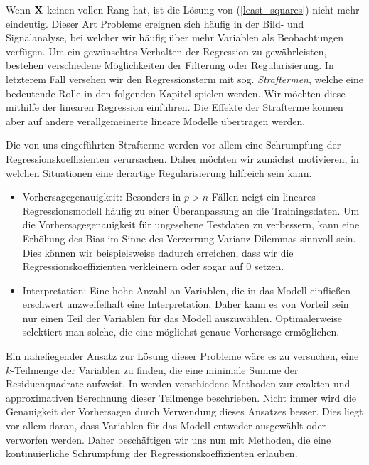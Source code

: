 Wenn $\mathbf{X}$ keinen vollen Rang hat, ist die Lösung von (\ref{least_squares}) nicht mehr eindeutig. Dieser Art Probleme ereignen sich häufig in der Bild- und Signalanalyse, bei welcher wir häufig über mehr Variablen als Beobachtungen verfügen. Um ein gewünschtes Verhalten der Regression zu gewährleisten, bestehen verschiedene Möglichkeiten der Filterung oder Regularisierung. In letzterem Fall versehen wir den Regressionsterm mit sog. \textit{Straftermen}, welche eine bedeutende Rolle in den folgenden Kapitel spielen werden. Wir möchten diese mithilfe der linearen Regression einführen. Die Effekte der Strafterme können aber auf andere verallgemeinerte lineare Modelle übertragen werden. 

Die von uns eingeführten Strafterme werden vor allem eine Schrumpfung der Regressionskoeffizienten verursachen. Daher möchten wir zunächst motivieren, in welchen Situationen eine derartige Regularisierung hilfreich sein kann.
\begin{itemize}
\item Vorhersagegenauigkeit: Besonders in $p > n$-Fällen neigt ein lineares Regressionsmodell häufig zu einer Überanpassung an die Trainingsdaten. Um die Vorhersagegenauigkeit für ungesehene Testdaten zu verbessern, kann eine Erhöhung des Bias im Sinne des Verzerrung-Varianz-Dilemmas sinnvoll sein. Dies können wir beispielsweise dadurch erreichen, dass wir die Regressionskoeffizienten verkleinern oder sogar auf 0 setzen.
\item Interpretation: Eine hohe Anzahl an Variablen, die in das Modell einfließen erschwert unzweifelhaft eine Interpretation. Daher kann es von Vorteil sein nur einen Teil der Variablen für das Modell auszuwählen. Optimalerweise selektiert man solche, die eine möglichst genaue Vorhersage ermöglichen.
\end{itemize}

Ein naheliegender Ansatz zur Lösung dieser Probleme wäre es zu versuchen, eine $k$-Teilmenge der Variablen zu finden, die eine minimale Summe der Residuenquadrate aufweist. In \cite{hastie_elements} werden verschiedene Methoden zur exakten und approximativen Berechnung dieser Teilmenge beschrieben. Nicht immer wird die Genauigkeit der Vorhersagen durch Verwendung dieses Ansatzes besser. Dies liegt vor allem daran, dass Variablen für das Modell entweder ausgewählt oder verworfen werden. Daher beschäftigen wir uns nun mit Methoden, die eine kontinuierliche Schrumpfung der Regressionskoeffizienten erlauben.\\


